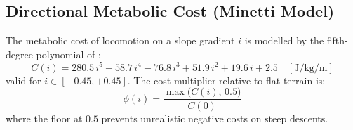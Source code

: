 \documentclass[11pt,a4paper]{article}
\begin{document}
\subsection{Directional Metabolic Cost (Minetti Model)}
\label{sec:minetti}

The metabolic cost of locomotion on a slope gradient $i$  is modelled by the fifth-degree polynomial of \citet{minetti2002}:
\begin{equation}
  C(i) = 280.5\,i^5 - 58.7\,i^4 - 76.8\,i^3 + 51.9\,i^2 + 19.6\,i + 2.5 \quad [\text{J/kg/m}]
  \label{eq:minetti}
\end{equation}
valid for $i \in [-0.45, +0.45]$.
The cost multiplier relative to flat terrain is:
\begin{equation}
  \phi(i) = \frac{\max\bigl(C(i),\, 0.5\bigr)}{C(0)}
  \label{eq:minetti_factor}
\end{equation}
where the floor at $0.5$ prevents unrealistic negative costs on steep descents.
\end{document}
